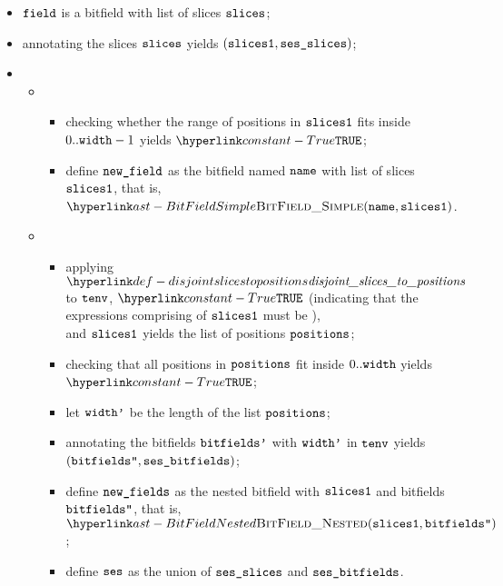 \ProseParagraph
\begin{itemize}
  \item $\texttt{field}$ is a bitfield with list of slices $\texttt{slices}$;
  \item annotating the slices $\texttt{slices}$ yields $(\texttt{slices1}, \texttt{ses\_slices})$\ProseOrTypeError;
  \item \OneApplies
  \begin{itemize}
    \item {}
    \begin{itemize}
      \item checking whether the range of positions in $\texttt{slices1}$ fits inside $0..\texttt{width}-1$ yields $\True$\ProseOrTypeError;
      \item define $\texttt{new\_field}$ as the bitfield named $\texttt{name}$ with list of slices $\texttt{slices1}$, that is, $\BitFieldSimple(\name, \slicesone)$.
    \end{itemize}

    \item {}
    \begin{itemize}
      \item applying $\disjointslicestopositions$ to $\texttt{tenv}$,
            $\True$ (indicating that the expressions comprising of $\texttt{slices1}$ must be \staticallyevaluableterm), \\
            and $\texttt{slices1}$
            yields the list of positions $\texttt{positions}$\ProseOrTypeError;
      \item checking that all positions in $\texttt{positions}$ fit inside $0..\texttt{width}$ yields \\
            $\True$\ProseOrTypeError;
      \item let $\texttt{width'}$ be the length of the list $\texttt{positions}$;
      \item annotating the bitfields $\texttt{bitfields'}$ with $\texttt{width'}$ in \staticenvironmentterm{} $\texttt{tenv}$ yields $ (\texttt{bitfields''}, \texttt{ses\_bitfields})$\ProseOrTypeError;
      \item define $\texttt{new\_fields}$ as the nested bitfield with $\texttt{slices1}$ and bitfields \\
            $\texttt{bitfields''}$, that is, $\BitFieldNested(\slicesone, \bitfieldspp)$;
      \item define $\texttt{ses}$ as the union of $\texttt{ses\_slices}$ and $\texttt{ses\_bitfields}$.
    \end{itemize}


\end{itemize}
\end{itemize}
